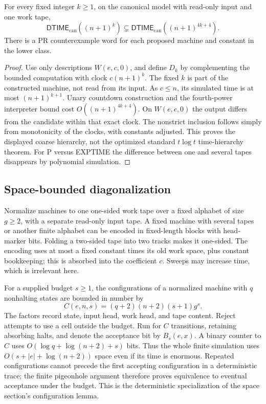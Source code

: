 \begin{theorem}\label{thm:H02}
For every fixed integer $k\ge1$, on the canonical model with read-only input and one work tape,
\[
 \mathsf{DTIME}_{\mathrm{can}}((n+1)^k)
 \subsetneq
 \mathsf{DTIME}_{\mathrm{can}}((n+1)^{4k+4}).
\]
There is a PR counterexample word for each proposed machine and constant in the lower class.
\end{theorem}
\begin{proof}
Use only descriptions $W(e,c,0)$, and define $D_k$ by complementing the bounded computation with clock $c(n+1)^k$. The fixed $k$ is part of the constructed machine, not read from its input. As $c\le n$, its simulated time is at most $(n+1)^{k+1}$. Unary countdown construction and the fourth-power interpreter bound cost $O((n+1)^{4k+4})$. On $W(e,c,0)$ the output differs from the candidate within that exact clock. The nonstrict inclusion follows simply from monotonicity of the clocks, with constants adjusted. This proves the displayed coarse hierarchy, not the optimized standard $t\log t$ time-hierarchy theorem. For P versus EXPTIME the difference between one and several tapes disappears by polynomial simulation.
\end{proof}

\subsection{Space-bounded diagonalization}
Normalize machines to one one-sided work tape over a fixed alphabet of size $g\ge2$, with a separate read-only input tape. A fixed machine with several tapes or another finite alphabet can be encoded in fixed-length blocks with head-marker bits. Folding a two-sided tape into two tracks makes it one-sided. The encoding uses at most a fixed constant times its old work space, plus constant bookkeeping; this is absorbed into the coefficient $c$. Sweeps may increase time, which is irrelevant here.

For a supplied budget $s\ge1$, the configurations of a normalized machine with $q$ nonhalting states are bounded in number by
\[
 C(e,n,s)=(q+2)(n+2)(s+1)g^s.
\]
The factors record state, input head, work head, and tape content. Reject attempts to use a cell outside the budget. Run for $C$ transitions, retaining absorbing halts, and denote the acceptance bit by $B_s(e,x)$. A binary counter to $C$ uses $O(\log q+\log(n+2)+s)$ bits. Thus the whole finite simulation uses $O(s+|e|+\log(n+2))$ space even if its time is enormous. Repeated configurations cannot precede the first accepting configuration in a deterministic trace; the finite pigeonhole argument therefore proves equivalence to eventual acceptance under the budget. This is the deterministic specialization of the space section's configuration lemma.

